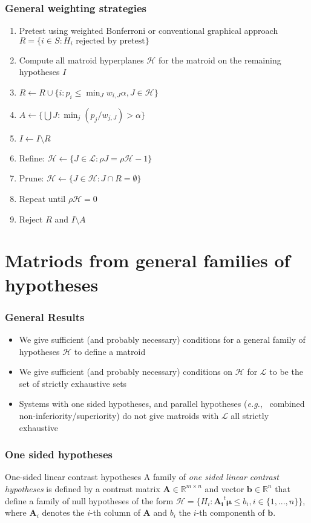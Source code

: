 \documentclass[bigger]{beamer}
\newcommand{\bs}[1]{\bm{#1}}
\newcommand{\eg}{{\sl e.g.},~}
\begin{document}
\begin{frame}
\frametitle{General weighting strategies}

\begin{enumerate}
\item Pretest using weighted Bonferroni or conventional graphical
 approach $R = \{i \in S: H_i \textrm{ rejected by pretest}\}$
\item Compute all matroid hyperplanes $\mathscr{H}$ for the matroid on
 the remaining hypotheses $I$
\item $R \gets R \cup \{i: p_i \leq \min_J w_{i,J} \alpha, J \in \mathscr{H}\}$
\item $A \gets \{\bigcup J: \min_j (p_j / w_{j,J}) > \alpha\}$
\item $I \gets I \setminus R$
\item Refine: $\mathscr{H} \gets \{J\in \mathscr{L}: \rho J = \rho
 \mathscr{H} - 1\}$
\item Prune: $\mathscr{H} \gets \{J \in \mathscr{H}: J \cap R = \emptyset\}$
\item Repeat until $\rho \mathscr {H} = 0$
\item Reject $R$ and $I \setminus A$
\end{enumerate}
\end{frame}
\section{Matriods from general families of hypotheses}



\begin{frame}
\frametitle{General Results}
\begin{itemize}
\item We give sufficient (and probably necessary) conditions for a
 general family of hypotheses $\mathscr{H}$ to define a matroid
\item We give sufficient (and probably necessary) conditions on
 $\mathscr{H}$ for $\mathscr{L}$ to be the set of strictly exhaustive
 sets
\item Systems with one sided hypotheses, and parallel hypotheses (\eg
 combined non-inferiority/superiority) do not give matroids with
 $\mathscr{L}$ all strictly exhaustive
\end{itemize}


\end{frame}

\begin{frame}
 \frametitle{One sided hypotheses}
 \begin{block}{One-sided linear contrast hypotheses}
   A family of {\em one sided linear contrast hypotheses} is defined
   by a contrast matrix $\bs{A} \in \mathbb{R}^{m\times n}$ and
   vector $\bs{b} \in \mathbb{R}^n$ that define a  family of null
   hypotheses of the form $\mathscr{H} = \{H_i: \bs{A_i}^t\bs{\mu}
   \leq b_i,i \in \{1,...,n\}\}$, where $\bs{A}_i$ denotes the $i$-th
   column of $\bs{A}$ and $b_i$ the $i$-th componenth of $\bs{b}$.
 \end{block}
\end{frame}
\end{document}
